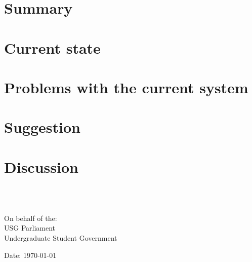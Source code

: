 \documentclass[a4paper,10pt]{article}
\begin{document}
	\tableofcontents
	\thispagestyle{main}
	\section{Summary}
		
	\section{Current state}
		
	\section{Problems with the current system}
		
  \section{Suggestion}
	  
  \section{Discussion}
	  
	  \ \\\ \\
  \begin{minipage}{0.5\textwidth}
  	\begin{flushleft}
  		On behalf of the:\\
  		USG Parliament\\
  		Undergraduate Student Government
  	\end{flushleft}
  \end{minipage}
\begin{minipage}{0.5\textwidth}
\begin{flushright}
Date: \today\\\ \\\ 
\end{flushright}
\end{minipage}
	\label{theEnd}
\end{document}
